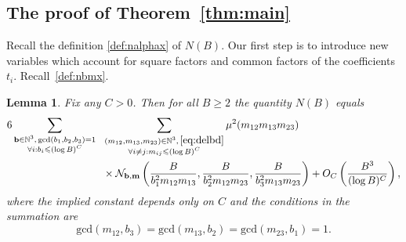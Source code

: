 \documentclass[a4paper,12pt,reqno]{amsart}
\numberwithin{equation}{section} \numberwithin{figure}{section}
\newcommand\N{\mathbb{N}}
\renewcommand{\l}{\left}
\renewcommand{\r}{\right}
\renewcommand{\b}{\mathbf}
\renewcommand{\gcd}{\textrm{gcd}}
\renewcommand{\leq}{\leqslant}
\renewcommand{\geq}{\geqslant}
\renewcommand{\#}{\sharp}
\newtheorem{lemma}{Lemma}
\theoremstyle{definition}
\numberwithin{lemma}{section}
\begin{document}
 \subsection{The proof of Theorem~\ref{thm:main}}  \label{sec:proofmain}
Recall the definition \eqref{def:nalphax} of $N(B)$. Our first step  is to introduce new variables which account for square factors and common factors of the coefficients $t_i$. Recall~\eqref{def:nbmx}.
 \begin{lemma} 
\label{lem:hool1}
Fix any $C>0$. Then for all $B\geq 2   $   
the quantity $N(B) $ equals \begin{align*}
6  \sum_{\substack{\b b \in  \N ^3, \, \gcd(b_1,b_2,b_3)=1   \\ \forall i: b_i \leq (\log B)^C }}
\ \   & \sum_{\substack{
 (m_{12},m_{13},m_{23})\in \N^3, \, \eqref{eq:delbd}
\\ \forall i\neq j:  m_{ij} \leq  (\log  B)^C   }}   \mu^2(m_{12} m_{13} m_{23})
\\ &\times
 \mathcal{N}_{ \b b, \b m}\l(  \frac{B}{ b_1^2 m_{12}m_{13}},
\frac{B}{ b_2^2  m_{12}m_{23} } , 
\frac{B}{ b_3^2  m_{13}m_{23} } \r)  +O_C\l(
\frac{B^3 }{(\log B)^C}
\r),\end{align*}
where  the implied constant depends only on $C$ 
and the conditions in the summation are
\begin{equation} \label{eq:delbd}   \gcd(m_{12},b_3  )= \gcd(m_{13},b_2   )= \gcd(m_{23},b_1   )=1.
 \end{equation}   
 \end{lemma} 
\end{document}
